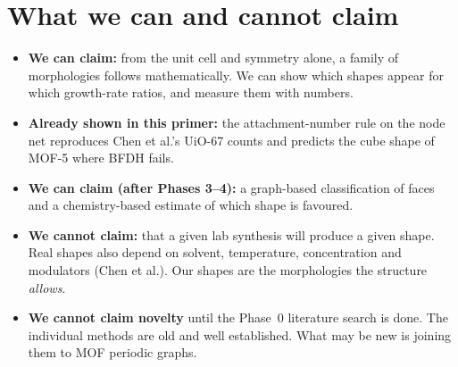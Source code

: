 \documentclass[11pt,a4paper]{article}
\theoremstyle{remark}\newtheorem*{example}{Worked example}
\begin{document}
\section{What we can and cannot claim}
\begin{itemize}
\item \textbf{We can claim:} from the unit cell and symmetry alone, a family of morphologies follows mathematically. We can show which shapes appear for which growth-rate ratios, and measure them with numbers.
\item \textbf{Already shown in this primer:} the attachment-number rule on the node net reproduces Chen et al.'s UiO-67 counts and predicts the cube shape of MOF-5 where BFDH fails.
\item \textbf{We can claim (after Phases 3--4):} a graph-based classification of faces and a chemistry-based estimate of which shape is favoured.
\item \textbf{We cannot claim:} that a given lab synthesis will produce a given shape. Real shapes also depend on solvent, temperature, concentration and modulators (Chen et al.). Our shapes are the morphologies the structure \emph{allows}.
\item \textbf{We cannot claim novelty} until the Phase~0 literature search is done. The individual methods are old and well established. What may be new is joining them to MOF periodic graphs.
\end{itemize}

\appendix
\end{document}

